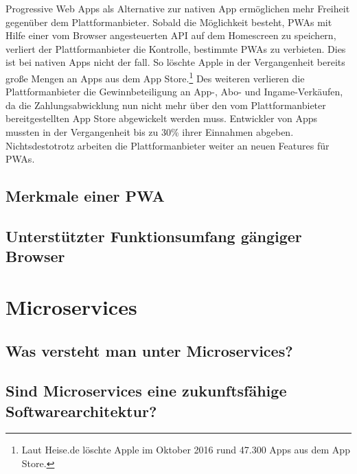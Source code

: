 Progressive Web Apps als Alternative zur nativen App ermöglichen mehr Freiheit gegenüber dem
Plattformanbieter. Sobald die Möglichkeit besteht, PWAs mit Hilfe einer vom Browser angesteuerten API
auf dem Homescreen zu speichern, verliert der Plattformanbieter die Kontrolle,
bestimmte PWAs zu verbieten. Dies ist bei nativen Apps nicht der fall. So löschte Apple in der Vergangenheit
bereits große Mengen an Apps aus dem App Store.\footnote{Laut Heise.de löschte Apple im Oktober 2016 rund 47.300 Apps aus dem App Store.\cite{HeiseAppleLoeschtApps}} 
Des weiteren verlieren die Plattformanbieter die Gewinnbeteiligung an App-, Abo- und Ingame-Verkäufen,
da die Zahlungsabwicklung nun nicht mehr über den vom Plattformanbieter bereitgestellten App Store
abgewickelt werden muss. Entwickler von Apps mussten in der Vergangenheit bis zu 30\% 
ihrer Einnahmen abgeben. \cite{WinFutureEigenerAppStore} Nichtsdestotrotz arbeiten
die Plattformanbieter weiter an neuen Features für PWAs.


\subsection{Merkmale einer PWA}
\label{subsec:markmaleeinerpwa}

\subsection{Unterstützter Funktionsumfang gängiger Browser}
\label{subsec:unterstuetzterfunktionsumfanggaengigerbrowser}

\section{Microservices}
\label{sec:microservices}

\subsection{Was versteht man unter Microservices?}
\label{subsec:wasverstehtmanuntermicroservices}

\subsection{Sind Microservices eine zukunftsfähige Softwarearchitektur?}
\label{subsec:sindmicroserviceseinezukunftsfaehigesoftwarearchitektur}

